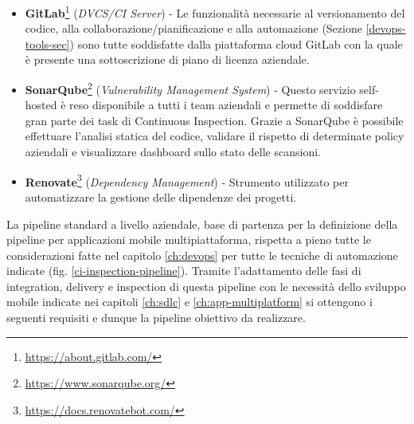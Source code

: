 \begin{itemize}
    \item \textbf{GitLab}\footnote{\href{https://about.gitlab.com/}{https://about.gitlab.com/}} (\textit{DVCS/CI Server}) - Le funzionalità necessarie al versionamento del codice, alla collaborazione/pianificazione e alla automazione (Sezione \ref{devops-tools-sec}) sono tutte soddisfatte dalla piattaforma cloud GitLab con la quale è presente una sottoscrizione di piano di licenza aziendale.
    \item \textbf{SonarQube}\footnote{\href{https://www.sonarqube.org/}{https://www.sonarqube.org/}} (\textit{Vulnerability Management System}) - Questo servizio self-hosted è reso disponibile a tutti i team aziendali e permette di soddisfare gran parte dei task di Continuous Inspection. Grazie a SonarQube è possibile effettuare l'analisi statica del codice, validare il rispetto di determinate policy aziendali e visualizzare dashboard sullo stato delle scansioni.
    \item \textbf{Renovate}\footnote{\href{https://docs.renovatebot.com/}{https://docs.renovatebot.com/}} (\textit{Dependency Management}) - Strumento utilizzato per automatizzare la gestione delle dipendenze dei progetti. 
\end{itemize}

La pipeline standard a livello aziendale, base di partenza per la definizione della pipeline per applicazioni mobile multipiattaforma, rispetta a pieno tutte le considerazioni fatte nel capitolo \ref{ch:devops} per tutte le tecniche di automazione indicate (fig. \ref{ci-inspection-pipeline}). Tramite l'adattamento delle fasi di integration, delivery e inspection di questa pipeline con le necessità dello sviluppo mobile indicate nei capitoli \ref{ch:sdlc} e \ref{ch:app-multiplatform} si ottengono i seguenti requisiti e dunque la pipeline obiettivo da realizzare.

